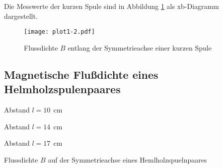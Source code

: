 \noindent Die Messwerte der kurzen Spule sind in Abbildung
\ref{fig:b} als xb-Diagramm dargestellt.

\begin{figure}
\centering
  \texttt{[image: plot1-2.pdf]}
   \caption{Flussdichte $B$ entlang der Symmetrieachse einer kurzen Spule}
  \label{fig:b}
\end{figure}

\subsection{Magnetische Flußdichte eines Helmholzspulenpaares}
  
  \begin{table}[H]
  \centering
    \begin{subtable}{.3\linewidth}
      \centering
            \caption{Abstand $l=10\:\:\si{\centi\meter}$}

    \end{subtable}%
    \begin{subtable}{.3\linewidth}
      \centering
            \caption{Abstand $l=14\:\:\si{\centi\meter}$}

    \end{subtable} 
    \begin{subtable}{.3\linewidth}
      \centering
            \caption{Abstand $l=17\:\:\si{\centi\meter}$}

    \end{subtable} 
        \caption{Flussdichte $B$ auf der Symmetrieachse eines Hemlholzspuelnpaares}
    \label{tab:3}
\end{table}

